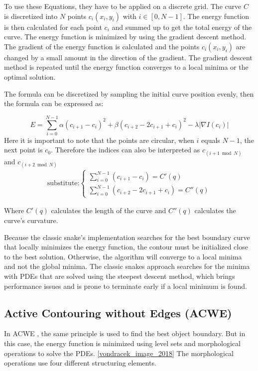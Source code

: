 To use these Equations, they have to be applied on a discrete grid. The curve $C$ is discretized into $N$ points  $c_i(x_i,y_i)$ with $i \in [0, N-1]$. The energy function is then calculated for each point $c_i$ and summed up to get the total energy of the curve. The energy function is minimized by using the gradient descent method. The gradient of the energy function is calculated and the points $c_i(x_i,y_i)$ are changed by a small amount in the direction of the gradient. The gradient descent method is repeated until the energy function converges to a local minima or the optimal solution. 

The formula can be discretized by sampling the initial curve position evenly, then the formula can be expressed as: 

\begin{equation}
    E = \sum_{i=0}^{N-1} \alpha (c_{i+1} - c_i)^2 + \beta (c_{i+2} - 2c_{i+1} + c_i)^2 - \lambda |\nabla I (c_i)|
\end{equation}
Here it is important to note that the points are circular, when $i$ equals $N-1$, the next point is $c_0$. Therefore the indices can also be interpreted as $c_{(i+1 \bmod N)}$ and $c_{(i+2 \bmod N)}$
\begin{align*}
    \text {substitute:} \begin{cases}
    \sum_{i=0}^{N-1}(c_{i+1} - c_i) = C'(q) \\
    \sum_{i=0}^{N-1}(c_{i+2} - 2c_{i+1} + c_i) = C''(q)
    \end{cases}
\end{align*}

Where $C'(q)$ calculates the length of the curve and $C''(q)$ calculates the curve's curvature.  

Because the classic snake's implementation searches for the best boundary curve that locally minimizes the energy function, the contour must be initialized close to the best solution. Otherwise, the algorithm will converge to a local minima and not the global minima. The classic snakes approach searches for the minima with PDEs that are solved using the steepest descent method, which brings performance issues and is prone to terminate early if a local minimum is found. 

\subsection{Active Contouring without Edges (ACWE) }
\label{sus:acwe}
In ACWE \cite{vondracek_image_2018}, the same principle is used to find the best object boundary. But in this case, the energy function is minimized using level sets and morphological operations to solve the PDEs. \ref{vondracek_image_2018} The morphological operations use four different structuring elements. 

